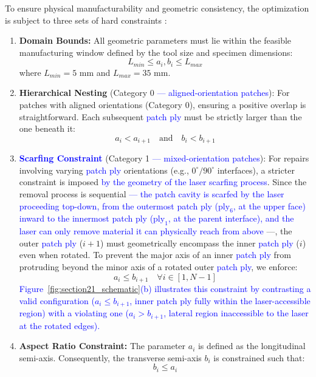 \documentclass[
  preprint,
  12pt,
  a4paper
]{elsarticle}
\newcommand{\new}[1]{\textcolor{blue}{#1}}
\begin{document}
To ensure physical manufacturability and geometric consistency, the optimization is subject to three sets of hard constraints \cite{psarras2024design}:

\begin{enumerate}
    \item \textbf{Domain Bounds:} All geometric parameters must lie within the feasible manufacturing window defined by the tool size and specimen dimensions:
    \begin{equation}
        L_{min} \leq a_i, b_i \leq L_{max}
    \end{equation}
    where $L_{min}=5$ mm and $L_{max}=35$ mm.

    \item \textbf{Hierarchical Nesting} (Category 0 \new{--- aligned-orientation patches}): For patches with aligned orientations (Category 0), ensuring a positive overlap is straightforward. Each subsequent \new{patch ply} must be strictly larger than the one beneath it:
    \begin{equation}
        a_i < a_{i+1} \quad \text{and} \quad b_i < b_{i+1}
    \end{equation}

    \item \textbf{\new{Scarfing Constraint}} (Category 1 \new{--- mixed-orientation patches}): For repairs involving varying \new{patch ply} orientations (e.g., $0^\circ/90^\circ$ interfaces), a stricter constraint is imposed \new{by the geometry of the laser scarfing process}. Since the removal process is sequential \new{--- the patch cavity is scarfed by the laser proceeding top-down, from the outermost patch ply ($\text{ply}_6$, at the upper face) inward to the innermost patch ply ($\text{ply}_1$, at the parent interface), and the laser can only remove material it can physically reach from above} ---, the outer \new{patch ply} ($i+1$) must geometrically encompass the inner \new{patch ply} ($i$) even when rotated. To prevent the major axis of an inner \new{patch ply} from protruding beyond the minor axis of a rotated outer \new{patch ply}, we enforce:
    \begin{equation}
        a_i \leq b_{i+1} \quad \forall i \in [1, N-1]
    \end{equation}
    \new{Figure~\ref{fig:section21_schematic}(b) illustrates this constraint by contrasting a valid configuration ($a_i \leq b_{i+1}$, inner patch ply fully within the laser-accessible region) with a violating one ($a_i > b_{i+1}$, lateral region inaccessible to the laser at the rotated edges).}

    \item \textbf{Aspect Ratio Constraint:} The parameter $a_i$ is defined as the longitudinal semi-axis. Consequently, the transverse semi-axis $b_i$ is constrained such that:
    \begin{equation}
        b_i \leq a_i
    \end{equation}
\end{enumerate}
\end{document}
